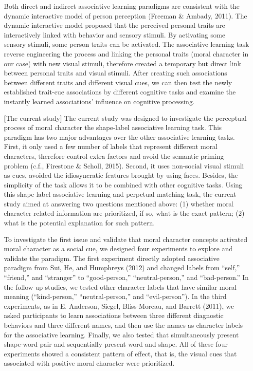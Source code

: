 \documentclass[
  english,
  man]{apa6}
\begin{document}
Both direct and indirect associative learning paradigms are consistent with the dynamic interactive model of person perception (Freeman \& Ambady, 2011). The dynamic interactive model proposed that the perceived personal traits are interactively linked with behavior and sensory stimuli. By activating some sensory stimuli, some person traits can be activated. The associative learning task reverse engineering the process and linking the personal traits (moral character in our case) with new visual stimuli, therefore created a temporary but direct link between personal traits and visual stimuli. After creating such associations between different traits and different visual cues, we can then test the newly established trait-cue associations by different cognitive tasks and examine the instantly learned associations' influence on cognitive processing.

{[}The current study{]}
The current study was designed to investigate the perceptual process of moral character the shape-label associative learning task. This paradigm has two major advantages over the other associative learning tasks. First, it only used a few number of labels that represent different moral characters, therefore control extra factors and avoid the semantic priming problem (c.f., Firestone \& Scholl, 2015). Second, it uses non-social visual stimuli as cues, avoided the idiosyncratic features brought by using faces. Besides, the simplicity of the task allows it to be combined with other cognitive tasks. Using this shape-label associative learning and perpetual matching task, the current study aimed at answering two questions mentioned above: (1) whether moral character related information are prioritized, if so, what is the exact pattern; (2) what is the potential explanation for such pattern.

To investigate the first issue and validate that moral character concepts activated moral character as a social cue, we designed four experiments to explore and validate the paradigm. The first experiment directly adopted associative paradigm from Sui, He, and Humphreys (2012) and changed labels from ``self,'' ``friend,'' and ``stranger'' to ``good-person,'' ``neutral-person,'' and ``bad-person.'' In the follow-up studies, we tested other character labels that have similar moral meaning (``kind-person,'' ``neutral-person,'' and ``evil-person''). In the third experiments, as in E. Anderson, Siegel, Bliss-Moreau, and Barrett (2011), we asked participants to learn associations between three different diagnostic behaviors and three different names, and then use the names as character labels for the associative learning. Finally, we also tested that simultaneously present shape-word pair and sequentially present word and shape. All of these four experiments showed a consistent pattern of effect, that is, the visual cues that associated with positive moral character were prioritized.
\end{document}
